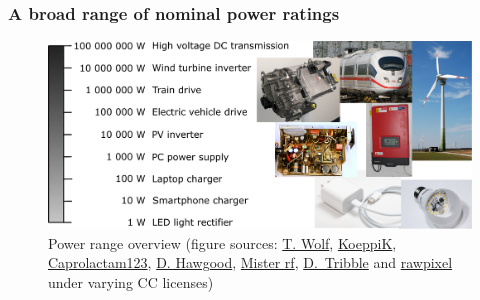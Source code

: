 \begin{frame}[c]
	\frametitle{A broad range of nominal power ratings}
	\vspace{0.3cm}
	\begin{figure}
		\centering
		\includegraphics[height=0.7\textheight]{fig/lec01/Power_Classes_Examples.pdf}
		\caption{Power range overview (figure sources: \href{https://commons.wikimedia.org/wiki/File:DB_AG_406_001-8.jpg}{T. Wolf}, \href{https://commons.wikimedia.org/wiki/File:Wind_turbine_with_observation_deck_bruck_an_der_leitha.jpg}{KoeppiK}, \href{https://commons.wikimedia.org/wiki/File:Vitesco_Technologies_EMR3.jpg}{Caprolactam123}, \href{https://commons.wikimedia.org/wiki/File:Installation_of_solar_PV_panels_-_inverter_-_geograph.org.uk_-_2624304.jpg}{D. Hawgood}, \href{https://commons.wikimedia.org/wiki/File:IBM_PC_XT_5160_Power_Supply.jpg}{Mister rf}, \href{https://commons.wikimedia.org/wiki/File:LED-E27-Light-Bulb-1134.jpg}{D.~Tribble} and \href{https://www.rawpixel.com/image/5923136/photo-image-phone-public-domain-white}{rawpixel} under varying CC licenses) }
		\label{Power_Classes_Examples}
	\end{figure}
\end{frame}

